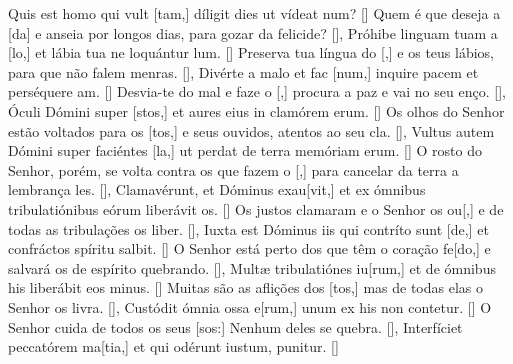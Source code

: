 {  %
  {Quis est homo qui vult [tam,] díligit dies ut vídeat \-num? [\LinkLA]}%
    {Quem é que deseja a [da] e anseia por longos dias, para gozar da felicide? [\LinkPT]},
  {Próhibe linguam tuam a [lo,] et lábia tua ne lo\-quántur \-lum. [\LinkLA]}%
    {Preserva tua língua do [,] e os teus lábios, para que não falem menras. [\LinkPT]},
  {Divérte a malo et fac [num,] inquire pacem et perséquere am. [\LinkLA]}%
    {Desvia-te do mal e faze o [,] procura a paz e vai no seu enço. [\LinkPT]},
  {Óculi Dómini super [stos,] et aures eius in clamórem erum. [\LinkLA]}%
    {Os olhos do Senhor estão voltados para os [tos,] e seus ouvidos, atentos ao seu cla. [\LinkPT]},
  {Vultus autem Dómini super faciéntes [la,] ut perdat de ter\-ra memóriam erum. [\LinkLA]}%
    {O rosto do Senhor, porém, se volta contra os que fazem o [,] para cancelar da terra a lembrança les. [\LinkPT]},
  {Clamavérunt, et Dóminus exau[vit,] et ex ómnibus tribulatiónibus eórum liberávit os. [\LinkLA]}%
    {Os justos clamaram e o Senhor os ou[,] e de todas as tribulações os liber. [\LinkPT]},
  {Iuxta est Dóminus iis qui contríto sunt [de,] et confráctos spíritu salbit. [\LinkLA]}%
    {O Senhor está perto dos que têm o coração fe[do,] e salvará os de espírito quebrando. [\LinkPT]},
  {Multæ tribulatiónes iu[rum,] et de ómnibus his liberábit eos minus. [\LinkLA]}%
    {Muitas são as aflições dos [tos,] mas de todas elas o Senhor os livra. [\LinkPT]},
  {Custódit ómnia ossa e[rum,] unum ex his non contetur. [\LinkLA]}%
    {O Senhor cuida de todos os seus [sos:] Nenhum deles se quebra. [\LinkPT]},
  {Interfíciet peccatórem ma[tia,] et qui odérunt iustum, puni\-tur. [\LinkLA]}%
}
